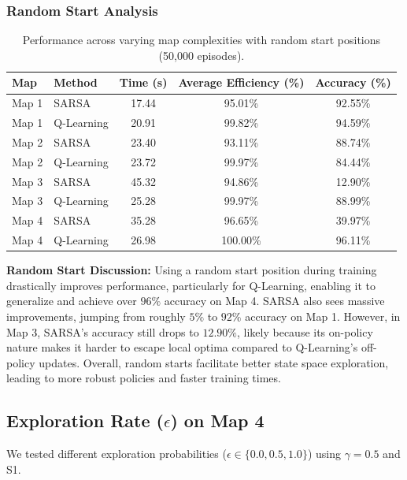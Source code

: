 \documentclass{article}
\begin{document}
\subsubsection{Random Start Analysis}
\begin{table}[H]
\centering
\begin{tabular}{llccc}
\toprule
\textbf{Map} & \textbf{Method} & \textbf{Time (s)} & \textbf{Average Efficiency (\%)} & \textbf{Accuracy (\%)} \\ \midrule
Map 1 & SARSA       & 17.44 & 95.01\% & 92.55\% \\
Map 1 & Q-Learning  & 20.91 & 99.82\% & 94.59\% \\
Map 2 & SARSA       & 23.40 & 93.11\% & 88.74\% \\
Map 2 & Q-Learning  & 23.72 & 99.97\% & 84.44\% \\
Map 3 & SARSA       & 45.32 & 94.86\% & 12.90\% \\
Map 3 & Q-Learning  & 25.28 & 99.97\% & 88.99\% \\
Map 4 & SARSA       & 35.28 & 96.65\% & 39.97\% \\
Map 4 & Q-Learning  & 26.98 & 100.00\% & 96.11\% \\ \bottomrule
\end{tabular}
\caption{Performance across varying map complexities with random start positions (50,000 episodes).}
\end{table}

\textbf{Random Start Discussion:} Using a random start position during training drastically improves performance, particularly for Q-Learning, enabling it to generalize and achieve over $96\%$ accuracy on Map 4. SARSA also sees massive improvements, jumping from roughly $5\%$ to $92\%$ accuracy on Map 1. However, in Map 3, SARSA's accuracy still drops to $12.90\%$, likely because its on-policy nature makes it harder to escape local optima compared to Q-Learning's off-policy updates. Overall, random starts facilitate better state space exploration, leading to more robust policies and faster training times.

\subsection{Exploration Rate ($\epsilon$) on Map 4}
We tested different exploration probabilities ($\epsilon \in \{0.0, 0.5, 1.0\}$) using $\gamma=0.5$ and S1.
\end{document}
